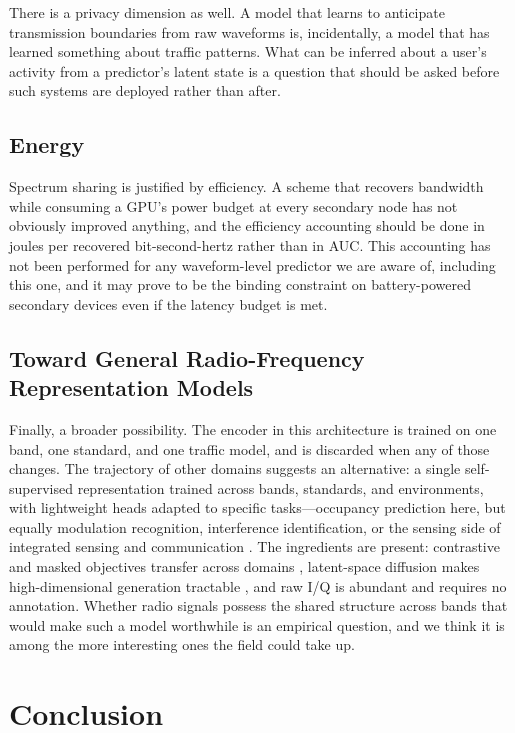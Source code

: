 \documentclass[lettersize,journal]{IEEEtran}
\begin{document}
There is a privacy dimension as well. A model that learns to anticipate
transmission boundaries from raw waveforms is, incidentally, a model
that has learned something about traffic patterns. What can be inferred
about a user's activity from a predictor's latent state is a question
that should be asked before such systems are deployed rather than after.

\subsection{Energy}
Spectrum sharing is justified by efficiency. A scheme that recovers
bandwidth while consuming a GPU's power budget at every secondary node
has not obviously improved anything, and the efficiency accounting should
be done in joules per recovered bit-second-hertz rather than in AUC.
This accounting has not been performed for any waveform-level predictor
we are aware of, including this one, and it may prove to be the binding
constraint on battery-powered secondary devices even if the latency
budget is met.

\subsection{Toward General Radio-Frequency Representation Models}
Finally, a broader possibility. The encoder in this architecture is
trained on one band, one standard, and one traffic model, and is
discarded when any of those changes. The trajectory of other domains
suggests an alternative: a single self-supervised representation trained
across bands, standards, and environments, with lightweight heads
adapted to specific tasks---occupancy prediction here, but equally
modulation recognition, interference identification, or the sensing side
of integrated sensing and communication \cite{Liu2022ISAC}. The
ingredients are present: contrastive and masked objectives transfer
across domains \cite{Oord2018,Chen2020}, latent-space diffusion makes
high-dimensional generation tractable \cite{Rombach2022}, and raw I/Q is
abundant and requires no annotation. Whether radio signals possess the
shared structure across bands that would make such a model worthwhile is
an empirical question, and we think it is among the more interesting
ones the field could take up.

\section{\textbf{Conclusion}}
\end{document}
